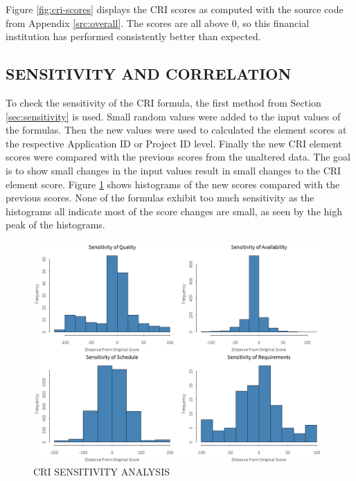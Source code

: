\documentclass[SDSUThesis.tex]{subfiles}
\begin{document}
        Figure \ref{fig:cri-scores}
        displays the CRI scores as computed with the source code
        from Appendix \ref{src:overall}.  The scores are all above 0, so this
        financial institution has performed consistently better
        than expected.  
        
    \subsection{SENSITIVITY AND CORRELATION}
        
        To check the sensitivity of the CRI formula, the first method
        from Section \ref{sec:sensitivity} is used.  Small random
        values were added to the input values of the formulas. 
        Then the new values were used to calculated the element scores 
        at the respective Application ID or Project ID level.  Finally
        the new CRI element scores were compared with the previous
        scores from the unaltered data.  The goal is to show small
        changes in the input values result in small changes to the 
        CRI element score.  Figure \ref{fig:sensitivity} shows
        histograms of the new scores compared with the previous scores.
        None of the formulas exhibit too much sensitivity as the 
        histograms all indicate most of the score changes are small,
        as seen by the high peak of the histograms.  
        
        \begin{figure}[hbt]
            \centering
            \includegraphics[scale=.25]{images/sensitivity.png}
            \caption{CRI SENSITIVITY ANALYSIS}
            \label{fig:sensitivity}
        \end{figure}
         
\end{document}
